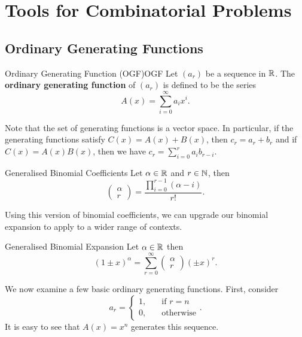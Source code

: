 \documentclass[math]{amznotes}
\theoremstyle{remark}
\begin{document}
\chapter{Tools for Combinatorial Problems}
\section{Ordinary Generating Functions}
\begin{dfnbox}{Ordinary Generating Function (OGF)}{OGF}
    Let $(a_r)$ be a sequence in $\mathbb{R}$. The {\color{red} \textbf{ordinary generating function}} of $(a_r)$ is defined to be the series
    \begin{equation*}
        A(x) = \sum_{i = 0}^{\infty}a_ix^i.
    \end{equation*}
\end{dfnbox}
Note that the set of generating functions is a vector space. In particular, if the generating functions satisfy $C(x) = A(x) + B(x)$, then $c_r = a_r + b_r$ and if $C(x) = A(x)B(x)$, then we have $c_r = \sum_{i = 0}^{r}a_ib_{r - i}$.
\begin{dfnbox}{Generalised Binomial Coefficients}{}
    Let $\alpha \in \mathbb{R}$ and $r \in \mathbb{N}$, then 
    \begin{equation*}
        \begin{pmatrix}
            \alpha \\
            r
        \end{pmatrix} = \frac{\prod_{i = 0}^{r - 1}(\alpha - i)}{r!}.
    \end{equation*}
\end{dfnbox}
Using this version of binomial coefficients, we can upgrade our binomial expansion to apply to a wider range of contexts.
\begin{dfnbox}{Generalised Binomial Expansion}{}
    Let $\alpha \in \mathbb{R}$ then 
    \begin{equation*}
        (1 \pm x)^\alpha = \sum_{r = 0}^{\infty}\begin{pmatrix}
            \alpha \\
            r
        \end{pmatrix}(\pm x)^r.
    \end{equation*}
\end{dfnbox}
We now examine a few basic ordinary generating functions. First, consider
\begin{equation*}
    a_r = \begin{cases}
        1, & \quad\textrm{if } r = n \\
        0, & \quad\textrm{otherwise}
    \end{cases}.
\end{equation*}
It is easy to see that $A(x) = x^n$ generates this sequence.
\end{document}
